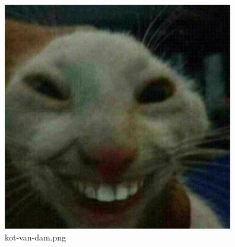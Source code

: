 \documentclass{article}
\begin{document}
\begin{figure}[ht!]
\centering
\includegraphics[height=10cm]{hw_2/test/kot-van-dam.png}
\vspace{9 mm}
\caption{kot-van-dam.png}
\end{figure}
\end{document}
